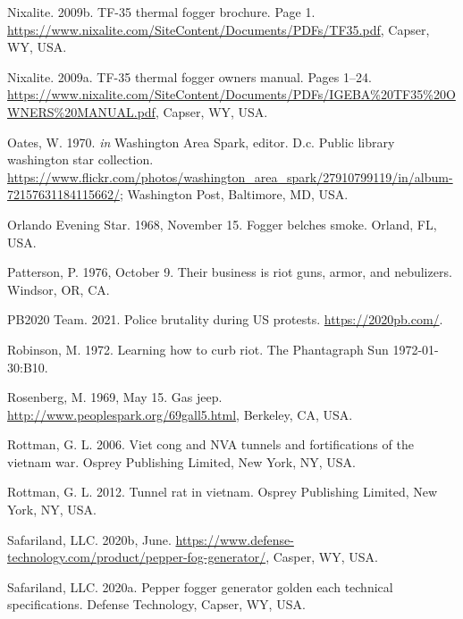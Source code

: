 \documentclass[
  11pt,
]{krantz}
\newlength{\cslhangindent}
\newenvironment{CSLReferences}[2] %
 {%
  \setlength{\parindent}{0pt}
  \ifodd #1 \everypar{\setlength{\hangindent}{\cslhangindent}}\ignorespaces\fi
  \ifnum #2 > 0
  \setlength{\parskip}{#2\baselineskip}
  \fi
 }%
 {}
\begin{document}
\begin{CSLReferences}{1}{0}
\leavevmode{}%
Nixalite. 2009b. TF-35 thermal fogger brochure. Page 1. \url{https://www.nixalite.com/SiteContent/Documents/PDFs/TF35.pdf}, Capser, WY, USA.

\leavevmode{}%
Nixalite. 2009a. TF-35 thermal fogger owners manual. Pages 1--24. \url{https://www.nixalite.com/SiteContent/Documents/PDFs/IGEBA\%20TF35\%20OWNERS\%20MANUAL.pdf}, Capser, WY, USA.

\leavevmode{}%
Oates, W. 1970. \emph{in} Washington Area Spark, editor. D.c. Public library washington star collection. \url{https://www.flickr.com/photos/washington_area_spark/27910799119/in/album-72157631184115662/}; Washington Post, Baltimore, MD, USA.

\leavevmode{}%
Orlando Evening Star. 1968, November 15. Fogger belches smoke. Orland, FL, USA.

\leavevmode{}%
Patterson, P. 1976, October 9. Their business is riot guns, armor, and nebulizers. Windsor, OR, CA.

\leavevmode{}%
PB2020 Team. 2021. Police brutality during US protests. \url{https://2020pb.com/}.

\leavevmode{}%
Robinson, M. 1972. Learning how to curb riot. The Phantagraph Sun 1972-01-30:B10.

\leavevmode{}%
Rosenberg, M. 1969, May 15. Gas jeep. \url{http://www.peoplespark.org/69gall5.html}, Berkeley, CA, USA.

\leavevmode{}%
Rottman, G. L. 2006. Viet cong and NVA tunnels and fortifications of the vietnam war. Osprey Publishing Limited, New York, NY, USA.

\leavevmode{}%
Rottman, G. L. 2012. Tunnel rat in vietnam. Osprey Publishing Limited, New York, NY, USA.

\leavevmode{}%
Safariland, LLC. 2020b, June. \url{https://www.defense-technology.com/product/pepper-fog-generator/}, Casper, WY, USA.

\leavevmode{}%
Safariland, LLC. 2020a. Pepper fogger generator golden each technical specifications. Defense Technology, Capser, WY, USA.


\end{CSLReferences}
\end{document}
